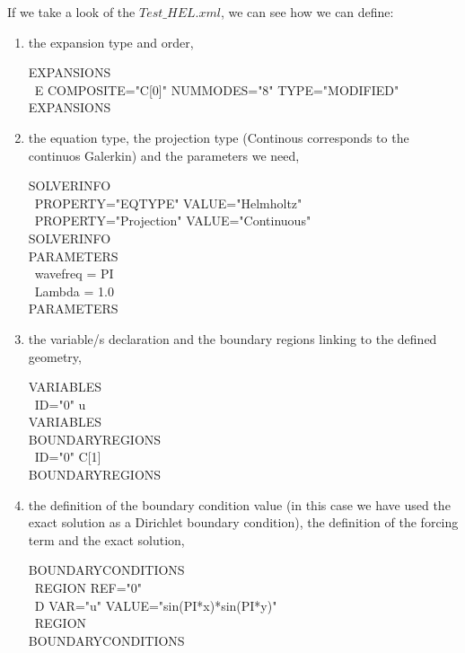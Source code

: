 \documentclass[12pt]{article}
\begin{document}
\noindent
If we take a look of the  $Test\_HEL.xml$, we can see how we can define:
\begin{enumerate}

\item  the expansion type and order,\\
\vspace{5mm}
\begin{algorithm2e}[H]
EXPANSIONS \\\
    E COMPOSITE="C[0]" NUMMODES="8" TYPE="MODIFIED" \\
EXPANSIONS\\
 \end{algorithm2e}

\item the equation type, the projection type (Continous corresponds to the continuos Galerkin) and the parameters we need,\\    
\vspace{5mm}
\begin{algorithm2e}[H]
SOLVERINFO\\\
     PROPERTY="EQTYPE" VALUE="Helmholtz"\\\
     PROPERTY="Projection" VALUE="Continuous"\\
SOLVERINFO\\

PARAMETERS\\\
    wavefreq       = PI \\\
     Lambda        = 1.0\\
PARAMETERS
 \end{algorithm2e}

\item the variable/s declaration and the boundary regions linking to the defined geometry,\\    
\vspace{5mm}
\begin{algorithm2e}[H]
VARIABLES\\\
     ID="0" u \\ 
VARIABLES\\

BOUNDARYREGIONS\\\
    ID="0" C[1] \\
BOUNDARYREGIONS\\
\end{algorithm2e}

\item the definition of the boundary condition value (in this case we have used the exact solution as a Dirichlet boundary condition), the definition of the forcing term and the exact solution,\\
\vspace{5mm}
\begin{algorithm2e}[H]
BOUNDARYCONDITIONS\\\
         REGION REF="0"\\\
            D VAR="u" VALUE="sin(PI*x)*sin(PI*y)" \\\
         REGION\\
 BOUNDARYCONDITIONS\\
    

\end{algorithm2e}
\end{enumerate}
\end{document}
